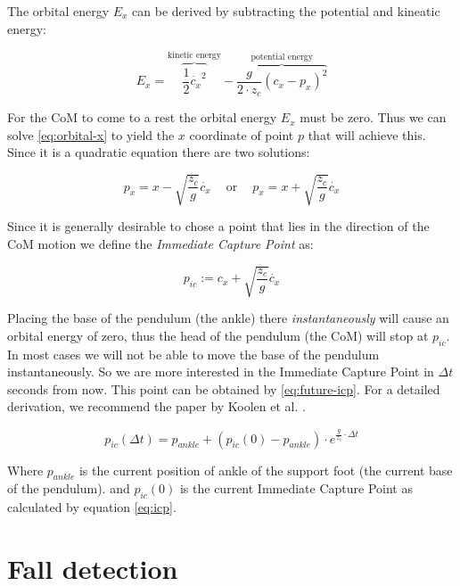 \documentclass[english,ngerman]{KITreprt}
\begin{document}
The orbital energy $E_x$ can be derived by subtracting the potential and
kineatic energy:

\begin{equation} \label{eq:orbital-x}
E_x = \overbrace{\frac{1}{2} \dot{c_x}^2}^{\text{kinetic energy}} - \overbrace{\frac{g}{2 \cdot z_c} (c_x - p_x)^2}^{\text{potential energy}}
\end{equation}

For the CoM to come to a rest the orbital energy $E_x$ must be zero.
Thus we can solve \ref{eq:orbital-x} to yield the $x$ coordinate of
point $p$ that will achieve this. Since it is a quadratic equation there
are two solutions:

\begin{equation}
p_x = x - \sqrt{\frac{z_c}{g}} \dot{c_x} \:\:\:\:\text{ or }\:\:\:\: p_x = x + \sqrt{\frac{z_c}{g}} \dot{c_x}
\end{equation}

Since it is generally desirable to chose a point that lies in the
direction of the CoM motion we define the \emph{Immediate Capture Point}
as:

\begin{equation} \label{eq:icp}
p_{ic} := c_x + \sqrt{\frac{z_c}{g}} \dot{c_x}
\end{equation}

Placing the base of the pendulum (the ankle) there
\emph{instantaneously} will cause an orbital energy of zero, thus the
head of the pendulum (the CoM) will stop at $p_{ic}$. In most cases we
will not be able to move the base of the pendulum instantaneously. So we
are more interested in the Immediate Capture Point in $\Delta t$ seconds
from now. This point can be obtained by \ref{eq:future-icp}. For a
detailed derivation, we recommend the paper by Koolen et al.
\cite{koolen2012capturability}.

\begin{equation} \label{eq:future-icp}
p_{ic}(\Delta t) = p_{ankle} + (p_{ic}(0) - p_{ankle}) \cdot e^{\frac{g}{z_c} \cdot \Delta t}
\end{equation}

Where $p_{ankle}$ is the current position of ankle of the support foot
(the current base of the pendulum). and $p_{ic}(0)$ is the current
Immediate Capture Point as calculated by equation \ref{eq:icp}.

\section{Fall detection}\label{fall-detection}
\end{document}
